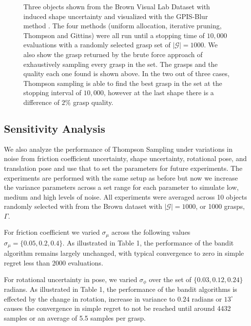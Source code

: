 \documentclass[10pt, conference]{ieeeconf}      %
\newcommand{\mG}{\mathcal{G}}
\begin{document}
\begin{figure}%
\label{fig:shape_examples}
    \centering
  
    \caption{Three objects shown from the Brown Visual Lab Dataset with induced shape uncertainty and visualized with the GPIS-Blur method \cite{mahler2015gp}. The four methods (uniform allocation, iterative pruning, Thompson and Gittins) were all run until a stopping time of $10,000$ evaluations with a randomly selected grasp set of $|\mG|=1000$. We also show the grasp returned by the brute force approach of exhaustively sampling every grasp in the set.  The grasps and the quality each one found is shown above.  In the two out of three cases, Thompson sampling is able to find the best grasp in the set at the stopping interval of $10,000$, however at the last shape there is a difference of $2\%$ grasp quality.}%
    \label{fig:shape_samples}%
\end{figure}


\subsection{Sensitivity Analysis }\label{sec:sensitivity}
We also analyze the performance of Thompson Sampling under variations in noise from friction coefficient uncertainty, shape uncertainty, rotational pose, and translation pose and use that to set the parameters for future experiments.
The experiments are performed with the same setup as before but now we increase the variance parameters across a set range for each parameter to simulate low, medium and high levels of noise.
All experiments were averaged across 10 objects randomly selected with from the Brown dataset with $|\mG| = 1000$, or 1000 grasps, $\Gamma$. 

For friction coefficient we varied $\sigma_{\mu}$ across the following values $\sigma_{\mu} = \lbrace 0.05, 0.2, 0.4 \rbrace$.
As illustrated in Table 1, the performance of the bandit algorithm remains largely unchanged, with typical convergence to zero in simple regret less than 2000 evaluations.

For rotational uncertainty in pose, we varied $\sigma_{\phi}$ over the set of $\lbrace 0.03, 0.12,0.24\rbrace$ radians. As illustrated in Table 1, the performance of the bandit algorithms is effected by the change in rotation, increase in variance to $0.24$ radians or $13^{\circ}$  causes the convergence in simple regret to not be reached until around 4432 samples or an average of 5.5 samples per grasp. 
\end{document}
